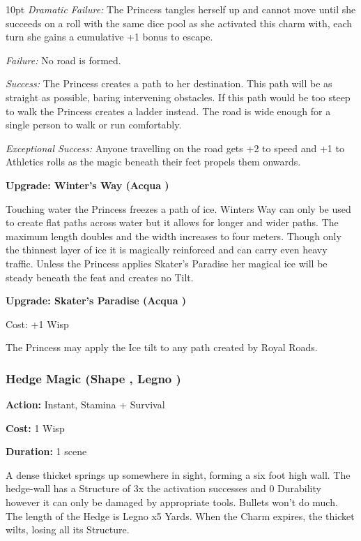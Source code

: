 \begin{myindentpar}{10pt} \emph{Dramatic Failure:} The Princess tangles herself up and cannot move until she succeeds on a roll with the same dice pool as she activated this charm with, each turn she gains a cumulative +1 bonus to escape.
 
\emph{Failure:} No road is formed.

\emph{Success:} The Princess creates a path to her destination. This path will be as straight as possible, baring intervening obstacles. If this path would be too steep to walk the Princess creates a ladder instead. The road is wide enough for a single person to walk or run comfortably.

\emph{Exceptional Success:} Anyone travelling on the road gets +2 to speed and +1 to Athletics rolls as the magic beneath their feet propels them onwards.

\textbf{Upgrade: Winter's Way (Acqua \textbullet\textbullet\textbullet)}

Touching water the Princess freezes a path of ice. Winters Way can only be used to create flat paths across water but it allows for longer and wider paths. The maximum length doubles and the width increases to four meters. Though only the thinnest layer of ice it is magically reinforced and can carry even heavy traffic. Unless the Princess applies Skater's Paradise her magical ice will be steady beneath the feat and creates no Tilt. 

\textbf{Upgrade: Skater's Paradise (Acqua \textbullet\textbullet\textbullet)}

Cost: +1 Wisp

The Princess may apply the Ice tilt to any path created by Royal Roads.\end{myindentpar}

\subsubsection*{Hedge Magic (Shape \textbullet\textbullet, Legno \textbullet)}

\noindent \textbf{Action:} Instant, Stamina + Survival

\noindent \textbf{Cost:} 1 Wisp

\noindent \textbf{Duration:} 1 scene

A dense thicket springs up somewhere in sight, forming a six foot high wall. The hedge-wall has a Structure of 3x the activation successes and 0 Durability however it can only be damaged by appropriate tools. Bullets won't do much. The length of the Hedge is Legno x5 Yards. When the Charm expires, the thicket wilts, losing all its Structure.


